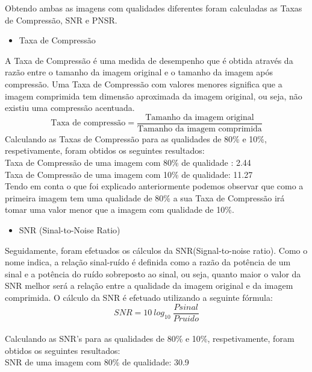 \documentclass[12pt,a4paper]{article}
\begin{document}
Obtendo ambas as imagens com qualidades diferentes foram calculadas as Taxas de Compressão, SNR e PNSR.\\\begin{itemize}
\item {Taxa de Compressão}
\end{itemize}
A Taxa de Compressão é uma medida de desempenho que é obtida através da razão entre o tamanho da imagem original e o tamanho da imagem após compressão. Uma Taxa de Compressão com valores menores significa que a imagem comprimida tem dimensão aproximada da imagem original, ou seja, não existiu uma compressão acentuada.\\
\[
\text{Taxa de compressão} = \frac{\text{Tamanho da imagem original}}{\text{Tamanho da imagem comprimida}}
\]
\newline
Calculando as Taxas de Compressão para as qualidades de 80\% e 10\%, respetivamente, foram obtidos os seguintes resultados:\\
\newline
Taxa de Compressão de uma imagem com 80\% de qualidade : 2.44\\
Taxa de Compressão de uma imagem com 10\% de qualidade: 11.27\\
\newline
Tendo em conta o que foi explicado anteriormente podemos observar que como a primeira imagem tem uma qualidade de 80\% a sua Taxa de Compressão irá tomar uma valor menor que a imagem com qualidade de 10\%.\\
\begin{itemize}
\item {SNR (Sinal-to-Noise Ratio)}
\end{itemize}
Seguidamente, foram efetuados os cálculos da SNR(Signal-to-noise ratio). Como o nome indica, a relação sinal-ruído é definida como a razão da potência de um sinal e a potência do ruído sobreposto ao sinal, ou seja, quanto maior o valor da SNR melhor será a relação entre a qualidade da imagem original e da imagem comprimida. O cálculo da SNR é efetuado utilizando a seguinte fórmula:\\
\newline
\[
SNR = 10\: log_{10}\: \frac{Psinal}{Pruido}
\]\\
\newline
Calculando as SNR's para as qualidades de 80\% e 10\%, respetivamente, foram obtidos os seguintes resultados:\\
\newline
SNR de uma imagem com 80\% de qualidade: 30.9\\
\end{document}
